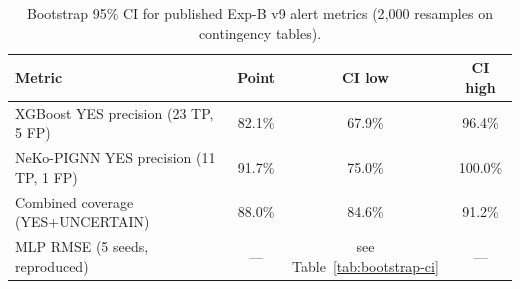 \begin{table}[htbp]
\centering
\caption{Bootstrap 95\% CI for published Exp-B v9 alert metrics (2{,}000 resamples on contingency tables).}
\label{tab:bootstrap-v9}
\small
\begin{tabular}{@{}lccc@{}}
\toprule
\textbf{Metric} & \textbf{Point} & \textbf{CI low} & \textbf{CI high} \\
\midrule
XGBoost YES precision (23 TP, 5 FP) & 82.1\% & 67.9\% & 96.4\% \\
NeKo-PIGNN YES precision (11 TP, 1 FP) & 91.7\% & 75.0\% & 100.0\% \\
Combined coverage (YES+UNCERTAIN) & 88.0\% & 84.6\% & 91.2\% \\
\midrule
MLP RMSE (5 seeds, reproduced) & --- & see Table~\ref{tab:bootstrap-ci} & --- \\
\bottomrule
\end{tabular}
\end{table}
